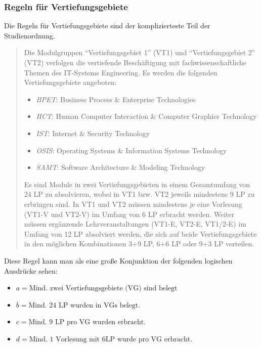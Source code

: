 \documentclass[ngerman]{article}
\begin{document}
\subsubsection{Regeln für Vertiefungsgebiete}
\label{sec:vertiefungsgebiete}

Die Regeln für Vertiefungsgebiete sind der komplizierteste Teil der Studienordnung.
\begin{quote}
    \begin{displayquote}
Die Modulgruppen ``Vertiefungsgebiet 1'' (VT1) und ``Vertiefungsgebiet 2'' (VT2) verfolgen die vertiefende Beschäftigung mit fachwissenschaftliche Themen des IT-Systems Engineering.
Es werden die folgenden Vertiefungsgebiete angeboten:
\begin{itemize}
    \item \emph{BPET}: Business Process \& Enterprise Technologies
    \item \emph{HCT}: Human Computer Interaction \& Computer Graphics Technology
    \item \emph{IST}: Internet \& Security Technology
    \item \emph{OSIS}: Operating Systems \& Information Systems Technology
    \item \emph{SAMT}: Software Architecture \& Modeling Technology
\end{itemize}
Es sind Module in zwei Vertiefungsgebieten in einem Gesamtumfang von 24 LP zu absolvieren, wobei in VT1
bzw. VT2 jeweils mindestens 9 LP zu erbringen sind. In VT1 und VT2 müssen mindestens je eine Vorlesung
(VT1-V und VT2-V) im Umfang von 6 LP erbracht werden. Weiter müssen ergänzende Lehrveranstaltungen
(VT1-E, VT2-E, VT1/2-E) im Umfang von 12 LP absolviert werden, die sich auf beide Vertiefungsgebiete in
den möglichen Kombinationen 3+9 LP, 6+6 LP oder 9+3 LP verteilen.
    \end{displayquote}
    \label{quo:vertiefungsgebiete}
\end{quote}
Diese Regel kann man als eine große Konjunktion der folgenden logischen Ausdrücke sehen:
\begin{itemize}
    \item $a = \text{Mind. zwei Vertiefungsgebiete (VG) sind belegt}$
    \item $b = \text{Mind. 24 LP wurden in VGs belegt}$.
    \item $c = \text{Mind. 9 LP pro VG wurden erbracht}$.
    \item $d = \text{Mind. 1 Vorlesung mit 6LP wurde pro VG erbracht}$.
\end{itemize}
\end{document}
